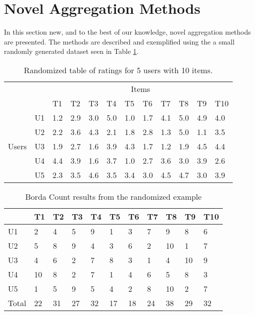 \section{Novel Aggregation Methods} \label{sec:novelaggregationmethods}
In this section new, and to the best of our knowledge, novel aggregation methods are presented. The methods are described and exemplified using the a small randomly generated dataset seen in Table \ref{tbl:randomratingstable}.

\begin{table}[H]
	\centering
	\begin{tabular}{cl|l|l|l|l|l|l|l|l|l|l|}
		\cline{3-12}
		\multicolumn{1}{l}{}                         &    & \multicolumn{10}{c|}{Items}                               \\ \cline{3-12} 
		\multicolumn{1}{l}{}                         &    & T1  & T2  & T3  & T4  & T5  & T6  & T7  & T8  & T9  & T10 \\ \hline
		\multicolumn{1}{|c|}{\multirow{5}{*}{Users}} & U1 & 1.2 & 2.9 & 3.0 & 5.0 & 1.0 & 1.7 & 4.1 & 5.0 & 4.9 & 4.0 \\ \cline{2-12} 
		\multicolumn{1}{|c|}{}                       & U2 & 2.2 & 3.6 & 4.3 & 2.1 & 1.8 & 2.8 & 1.3 & 5.0 & 1.1 & 3.5 \\ \cline{2-12} 
		\multicolumn{1}{|c|}{}                       & U3 & 1.9 & 2.7 & 1.6 & 3.9 & 4.3 & 1.7 & 1.2 & 1.9 & 4.5 & 4.4 \\ \cline{2-12} 
		\multicolumn{1}{|c|}{}                       & U4 & 4.4 & 3.9 & 1.6 & 3.7 & 1.0 & 2.7 & 3.6 & 3.0 & 3.9 & 2.6 \\ \cline{2-12} 
		\multicolumn{1}{|c|}{}                       & U5 & 2.3 & 3.5 & 4.6 & 3.5 & 3.4 & 3.0 & 4.5 & 4.7 & 3.0 & 3.9 \\ \hline
	\end{tabular}
	\caption{Randomized table of ratings for 5 users with 10 items.}
	\label{tbl:randomratingstable}
\end{table}


\begin{table}[H]
	\centering
	\begin{tabular}{l|l|l|l|l|l|l|l|l|l|l|}
		\cline{2-11}
		& T1 & T2 & T3 & T4 & T5 & T6 & T7 & T8 & T9 & T10 \\ \hline
		\multicolumn{1}{|l|}{U1} & 2 & 4 & 5 & 9 & 1 & 3 & 7 & 9 & 8 & 6 \\ \hline
		\multicolumn{1}{|l|}{U2} & 5 & 8 & 9 & 4 & 3 & 6 & 2 & 10 & 1 & 7 \\ \hline
		\multicolumn{1}{|l|}{U3} & 4 & 6 & 2 & 7 & 8 & 3 & 1 & 4 & 10 & 9 \\ \hline
		\multicolumn{1}{|l|}{U4} & 10 & 8 & 2 & 7 & 1 & 4 & 6 & 5 & 8 & 3 \\ \hline
		\multicolumn{1}{|l|}{U5} & 1 & 5 & 9 & 5 & 4 & 2 & 8 & 10 & 2 & 7 \\ \hline
		\multicolumn{1}{|l|}{Total} & 22 & 31 & 27 & 32 & 17 & 18 & 24 & 38 & 29 & 32 \\ \hline
	\end{tabular}
	\caption{Borda Count results from the randomized example}
	\label{tbl:bordacount}
\end{table}

